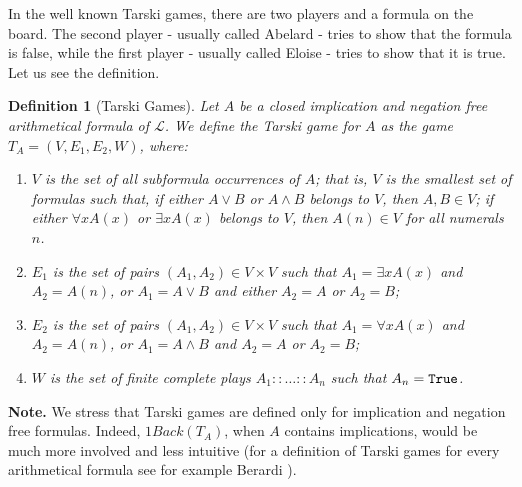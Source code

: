 \documentclass[copyright,creativecommons]{eptcs}
\newcommand{\True}                     { {\tt{True}} }
\newtheorem{definition}{Definition}
\begin{document}
 
 
In the well known Tarski games, there are two players and a formula
on the board. The second player - usually called Abelard - tries to
show that the formula is false, while the first player - usually
called Eloise - tries to show that it is true. Let us see the
definition.

\begin{definition}[Tarski Games]
\label{definition-TarskiGame} Let $A$ be a closed
implication and negation free arithmetical formula of $\mathcal{L}$. We define the
Tarski
game for $A$ as the game $T_A=(V, E_1, E_2, W)$, where:
\begin{enumerate}

\item
$V$ is the set of all subformula occurrences of $A$; that is, $V$ is the smallest set of formulas such that, if either $A\lor B$ or $A\land B$ belongs to $V$, then $A,B\in V$; if either $\forall x A(x)$ or $\exists x A(x)$ belongs to $V$, then $A(n)\in V$ for all numerals $n$. \\

\item
$E_1$ is the set of pairs $(A_1,A_2)\in V\times V$ such that   $A_1=\exists x
A(x)$  and $A_2=A(n)$,  or $A_1=A\lor B$ and either $A_2=A$ or
$A_2=B$;\\

\item
$ E_2$ is the set of pairs $(A_1,A_2)\in V\times V$ such that $A_1=\forall x
A(x)$  and $A_2=A(n)$,  or $A_1=A\land B$ and $A_2=A$ or
$A_2=B$;\\

\item
$W$ is the set of finite complete plays $A_1::\ldots ::A_n$ such that
$A_n=\True$.
\end{enumerate}
\end{definition}
\textbf{Note.} We stress that Tarski games are defined only for implication and negation free formulas. Indeed, $1Back(T_A)$, when $A$ contains implications, would be much more involved and less intuitive (for a definition of Tarski games for every arithmetical formula see for example Berardi \cite{Ber2}).\\
\end{document}
